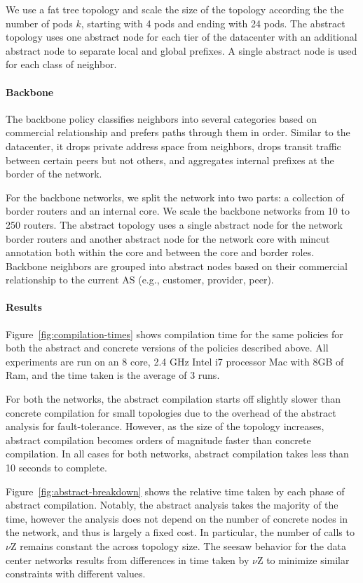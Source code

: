\documentclass[numbers, 10pt, preprint]{sigplanconf}
\newcommand{\para}[1]{\paragraph*{\textbf{#1}}}
\begin{document}
We use a fat tree topology and scale the size of the topology according the the number of pods $k$, starting with 4 pods and ending with 24 pods. The abstract topology uses one abstract node for each tier of the datacenter with an additional abstract node to separate local and global prefixes. A single abstract node is used for each class of neighbor.



\para{Backbone}

The backbone policy classifies neighbors into several categories based on commercial relationship and prefers paths through them in order. Similar to the datacenter, it drops private address space from  neighbors, drops transit traffic between certain peers but not others, and aggregates internal prefixes at the border of the network.

For the backbone networks, we split the network into two parts: a collection of border routers and an internal core. We scale the backbone networks from 10 to 250 routers. The abstract topology uses a single abstract node for the network border routers and another abstract node for the network core with mincut annotation both within the core and between the core and border roles. Backbone neighbors are grouped into abstract nodes based on their commercial relationship to the current AS (e.g., customer, provider, peer).


\para{Results}

Figure~\ref{fig:compilation-times} shows compilation time for the same policies for both the abstract and concrete versions of the policies described above. All experiments are run on an 8 core, 2.4 GHz Intel i7 processor Mac with 8GB of Ram, and the time taken is the average of 3 runs.

For both the networks, the abstract compilation starts off slightly slower than concrete compilation for small topologies due to the overhead of the abstract analysis for fault-tolerance. However, as the size of the topology increases, abstract compilation becomes orders of magnitude faster than concrete compilation. In all cases for both networks, abstract compilation takes less than 10 seconds to complete.

Figure~\ref{fig:abstract-breakdown} shows the relative time taken by each phase of abstract compilation. Notably, the abstract analysis takes the majority of the time, however the analysis does not depend on the number of concrete nodes in the network, and thus is largely a fixed cost. In particular, the number of calls to $\nu$Z remains constant the across topology size. The seesaw behavior for the data center networks results from differences in time taken by $\nu$Z to minimize similar constraints with different values.
\end{document}
